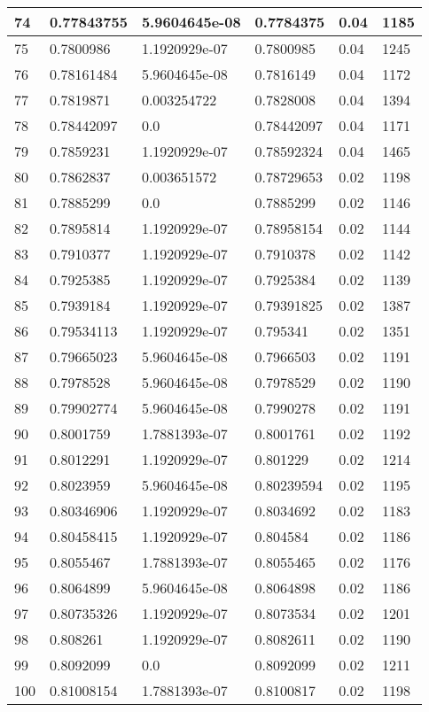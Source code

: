 \begin{longtable}{|l|l|l|l|l|l|}
74 & 0.77843755 & 5.9604645e-08 & 0.7784375 & 0.04 & 1185 \\ \hline 
75 & 0.7800986 & 1.1920929e-07 & 0.7800985 & 0.04 & 1245 \\ \hline 
76 & 0.78161484 & 5.9604645e-08 & 0.7816149 & 0.04 & 1172 \\ \hline 
77 & 0.7819871 & 0.003254722 & 0.7828008 & 0.04 & 1394 \\ \hline 
78 & 0.78442097 & 0.0 & 0.78442097 & 0.04 & 1171 \\ \hline 
79 & 0.7859231 & 1.1920929e-07 & 0.78592324 & 0.04 & 1465 \\ \hline 
80 & 0.7862837 & 0.003651572 & 0.78729653 & 0.02 & 1198 \\ \hline 
81 & 0.7885299 & 0.0 & 0.7885299 & 0.02 & 1146 \\ \hline 
82 & 0.7895814 & 1.1920929e-07 & 0.78958154 & 0.02 & 1144 \\ \hline 
83 & 0.7910377 & 1.1920929e-07 & 0.7910378 & 0.02 & 1142 \\ \hline 
84 & 0.7925385 & 1.1920929e-07 & 0.7925384 & 0.02 & 1139 \\ \hline 
85 & 0.7939184 & 1.1920929e-07 & 0.79391825 & 0.02 & 1387 \\ \hline 
86 & 0.79534113 & 1.1920929e-07 & 0.795341 & 0.02 & 1351 \\ \hline 
87 & 0.79665023 & 5.9604645e-08 & 0.7966503 & 0.02 & 1191 \\ \hline 
88 & 0.7978528 & 5.9604645e-08 & 0.7978529 & 0.02 & 1190 \\ \hline 
89 & 0.79902774 & 5.9604645e-08 & 0.7990278 & 0.02 & 1191 \\ \hline 
90 & 0.8001759 & 1.7881393e-07 & 0.8001761 & 0.02 & 1192 \\ \hline 
91 & 0.8012291 & 1.1920929e-07 & 0.801229 & 0.02 & 1214 \\ \hline 
92 & 0.8023959 & 5.9604645e-08 & 0.80239594 & 0.02 & 1195 \\ \hline 
93 & 0.80346906 & 1.1920929e-07 & 0.8034692 & 0.02 & 1183 \\ \hline 
94 & 0.80458415 & 1.1920929e-07 & 0.804584 & 0.02 & 1186 \\ \hline 
95 & 0.8055467 & 1.7881393e-07 & 0.8055465 & 0.02 & 1176 \\ \hline 
96 & 0.8064899 & 5.9604645e-08 & 0.8064898 & 0.02 & 1186 \\ \hline 
97 & 0.80735326 & 1.1920929e-07 & 0.8073534 & 0.02 & 1201 \\ \hline 
98 & 0.808261 & 1.1920929e-07 & 0.8082611 & 0.02 & 1190 \\ \hline 
99 & 0.8092099 & 0.0 & 0.8092099 & 0.02 & 1211 \\ \hline 
100 & 0.81008154 & 1.7881393e-07 & 0.8100817 & 0.02 & 1198 \\ \hline 
\end{longtable}